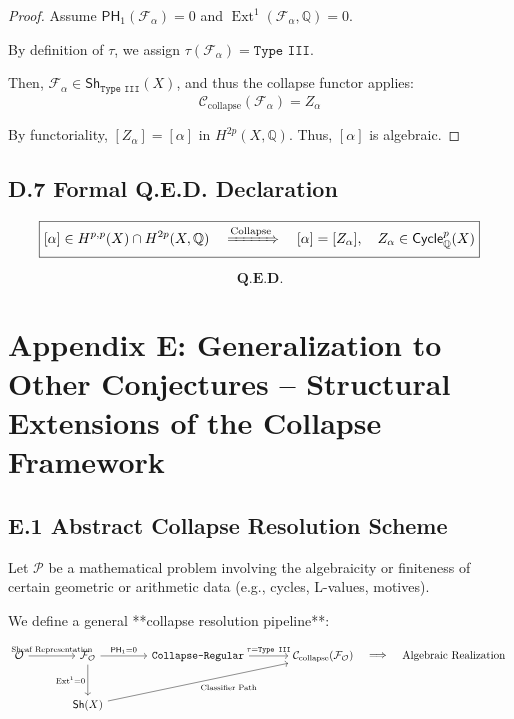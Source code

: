 \documentclass[11pt]{article}
\DeclareMathOperator{\Ext}{Ext}
\begin{document}
\begin{proof}
Assume $\mathsf{PH}_1(\mathcal{F}_\alpha) = 0$ and $\Ext^1(\mathcal{F}_\alpha, \mathbb{Q}) = 0$.

By definition of $\tau$, we assign $\tau(\mathcal{F}_\alpha) = \texttt{Type III}$.

Then, $\mathcal{F}_\alpha \in \mathsf{Sh}_{\texttt{Type III}}(X)$, and thus the collapse functor applies:
\[
\mathcal{C}_{\text{collapse}}(\mathcal{F}_\alpha) = Z_\alpha
\]

By functoriality, $[Z_\alpha] = [\alpha]$ in $H^{2p}(X, \mathbb{Q})$.  
Thus, $[\alpha]$ is algebraic.

\end{proof}

\subsection*{D.7 Formal Q.E.D. Declaration}

\[
\boxed{
[\alpha] \in H^{p,p}(X) \cap H^{2p}(X, \mathbb{Q}) \quad \xRightarrow{\text{Collapse}} \quad [\alpha] = [Z_\alpha], \quad Z_\alpha \in \mathsf{Cycle}_\mathbb{Q}^p(X)
}
\]

\[
\textbf{Q.E.D.}
\]



\section*{Appendix E: Generalization to Other Conjectures – Structural Extensions of the Collapse Framework}


\subsection*{E.1 Abstract Collapse Resolution Scheme}

Let $\mathcal{P}$ be a mathematical problem involving the algebraicity or finiteness of certain geometric or arithmetic data (e.g., cycles, L-values, motives).

We define a general **collapse resolution pipeline**:

\[
\begin{tikzcd}[row sep=large, column sep=large]
|[alias=O]| \mathcal{O} 
  \arrow[r, "\text{Sheaf Representation}"]
& |[alias=F]| \mathcal{F}_\mathcal{O} 
  \arrow[r, "\mathsf{PH}_1 = 0"] 
  \arrow[d, swap, "\Ext^1 = 0"]
& |[alias=R]| \texttt{Collapse-Regular} 
  \arrow[r, "\tau = \texttt{Type III}"]
& |[alias=C]| \mathcal{C}_{\text{collapse}}(\mathcal{F}_\mathcal{O}) 
  \arrow[r, phantom, "\Longrightarrow"]
& \text{Algebraic Realization} \\
& |[alias=S]| \mathsf{Sh}(X) 
  \arrow[to=C, swap, "\text{Classifier Path}"]
\end{tikzcd}
\]
\end{document}
